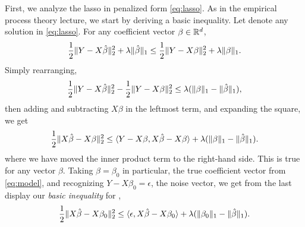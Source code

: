 \documentclass{article}
\begin{document}
First, we analyze the lasso in penalized form \eqref{eq:lasso}. As in the
empirical process theory lecture, we start by deriving a basic inequality. Let
\smash{$\hbeta$} denote any solution in \eqref{eq:lasso}. For any coefficient
vector $\beta \in \mathbb{R}^d$,  
\[
\frac{1}{2} \|Y - X\hat{\beta}\|_2^2 + \lambda\|\hat{\beta}\|_1 
\leq \frac{1}{2} \|Y - X\beta\|_2^2 + \lambda\|\beta\|_1.
\]
Simply rearranging, 
\[
\frac{1}{2} \|Y - X\hat{\beta}\|_2^2 - \frac{1}{2} \|Y - X\beta\|_2^2 \leq \lambda
(\|\beta\|_1 - \|\hat{\beta}\|_1), 
\]
then adding and subtracting $X\beta$ in the leftmost term, and expanding the
square, we get
\[
\frac{1}{2} \|X\hat{\beta} - X\beta\|_2^2 \leq \langle Y-X\beta, X\hat{\beta} - X\beta
\rangle + \lambda (\|\beta\|_1 - \|\hat{\beta}\|_1).
\]
where we have moved the inner product term to the right-hand side. This is true
for any vector $\beta$. Taking $\beta = \beta_0$ in particular, the true
coefficient vector from \eqref{eq:model}, and recognizing $Y - X\beta_0 =
\epsilon$, the noise vector, we get from the last display our \emph{basic
  inequality} for \smash{$\hbeta$}, 
\begin{equation}
\label{eq:basic_ineq_penalized1}
\frac{1}{2} \|X\hat{\beta} - X\beta_0\|_2^2 \leq \langle \epsilon, X\hat{\beta} - X\beta_0
\rangle + \lambda (\|\beta_0\|_1 - \|\hat{\beta}\|_1). 
\end{equation}
\end{document}
